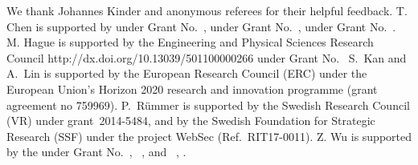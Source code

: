 \documentclass[acmsmall,screen]{acmart}\settopmatter{}
\begin{document}



%
 








%






\begin{acks}
We thank Johannes Kinder and anonymous referees for their helpful feedback.
%
T. Chen is supported by 
 under Grant No.~,   under Grant No.~,  under Grant No.~.
    M. Hague is supported by the
                 {Engineering and Physical Sciences Research Council}
                 {http://dx.doi.org/10.13039/501100000266}
    under Grant No.~
    S.~Kan and A.~Lin is supported by the European Research Council (ERC) 
    under the European
    Union's Horizon 2020 research and innovation programme (grant agreement no
    759969).
    P.\ R\"ummer is supported by the Swedish Research Council (VR)
    under grant~2014-5484, and by the Swedish Foundation for Strategic
    Research (SSF) under the project WebSec (Ref.\ RIT17-0011).
    Z. Wu is supported by the
    under Grant No.~, ~, and ~,
    .
\end{acks}


%


%
%
%
\end{document}
